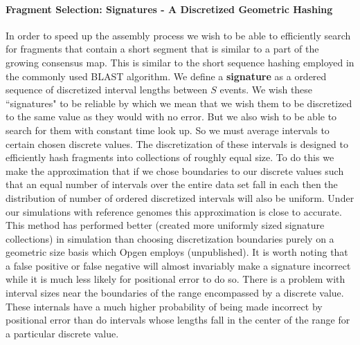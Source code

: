 \documentclass[11pt]{article}
\begin{document}
\paragraph{Fragment Selection: Signatures - A Discretized Geometric Hashing\newline}
\par{
In order to speed up the assembly process we wish to be able to efficiently search for fragments that contain a short segment that is similar to a part of the growing consensus map.  This is similar to the short sequence hashing employed in the commonly used BLAST algorithm. We define a \textbf{signature} as a ordered sequence of discretized interval lengths between $S$ events. We wish these ``signatures" to be reliable by which we mean that we wish them to be discretized to the same value as they would with no error. But we also wish to be able to search for them with constant time look up.  So we must average intervals to certain chosen discrete values.  The discretization of these intervals is designed to efficiently hash fragments into collections of roughly equal size.  To do this we make the approximation that if we chose boundaries to our discrete values such that an equal number of intervals over the entire data set fall in each then the distribution of number of ordered discretized intervals will also be uniform.  Under our simulations with reference genomes this approximation is close to accurate.  This method has performed better (created more uniformly sized signature collections) in simulation than choosing discretization boundaries purely on a geometric size basis which Opgen employs (unpublished). It is worth noting that a false positive or false negative will almost invariably make a signature incorrect while it is much less likely for positional error to do so.  There is a problem with interval sizes near the boundaries of the range encompassed by a discrete value.  These internals have a much higher probability of being made incorrect by positional error than do intervals whose lengths fall in the center of the range for a particular discrete value. }
\end{document}
